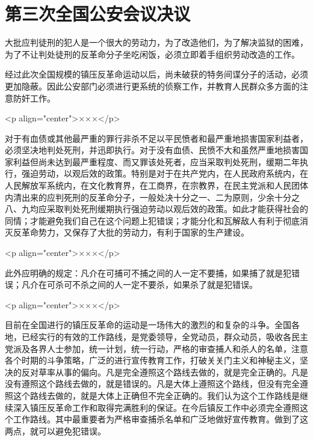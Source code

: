 \section[第三次全国公安会议决议（一九五一年五月十五日）]{第三次全国公安会议决议}


大批应判徒刑的犯人是一个很大的劳动力，为了改造他们，为了解决监狱的困难，为了不让判处徒刑的反革命分子坐吃闲饭，必须立即着手组织劳动改造的工作。

经过此次全国规模的镇压反革命运动以后，尚未破获的特务间谍分子的活动，必须更加隐蔽。因此公安部门必须进行更系统的侦察工作，并教育人民群众多方面的注意防奸工作。

<p align="center">×××</p>

对于有血债或其他最严重的罪行非杀不足以平民愤者和最严重地损害国家利益者，必须坚决地判处死刑，并迅即执行。对于没有血债、民愤不大和虽然严重地损害国家利益但尚未达到最严重程度、而又罪该处死者，应当采取判处死刑，缓期二年执行，强迫劳动，以观后效的政策。特别是对于在共产党内，在人民政府系统内，在人民解放军系统内，在文化教育界，在工商界，在宗教界，在民主党派和人民团体内清出来的应判死刑的反革命分子，一般处决十分之一、二为原则，少余十分之八、九均应采取判处死刑缓期执行强迫劳动以观后效的政策。如此才能获得社会的同情；才能避免我们自己在这个问题上犯错误；才能分化和瓦解敌人有利于彻底消灭反革命势力，又保存了大批的劳动力，有利于国家的生产建设。

<p align="center">×××</p>

此外应明确的规定：凡介在可捕可不捕之间的人一定不要捕，如果捕了就是犯错误；凡介在可杀可不杀之间的人一定不要杀，如果杀了就是犯错误。

<p align="center">×××</p>

目前在全国进行的镇压反革命的运动是一场伟大的激烈的和复杂的斗争。全国各地，已经实行的有效的工作路线，是党委领导，全党动员，群众动员，吸收各民主党派及各界人士参加，统一计划，统一行动，严格的审查捕人和杀人的名单，注意各个时期的斗争策略，广泛的进行宣传教育工作，打破关关门主义和神秘主义，坚决的反对草率从事的偏向。凡是完全遵照这个路线去做的，就是完全正确的。凡是没有遵照这个路线去做的，就是错误的。凡是大体上遵照这个路线，但没有完全遵照这个路线去做的，就是大体上正确但不完全正确的。我们认为这个工作路线是继续深入镇压反革命工作和取得完满胜利的保证。在今后镇反工作中必须完全遵照这个工作路线。其中最重要者为严格审查捕杀名单和广泛地做好宣传教育。做到了这两点，就可以避免犯错误。


